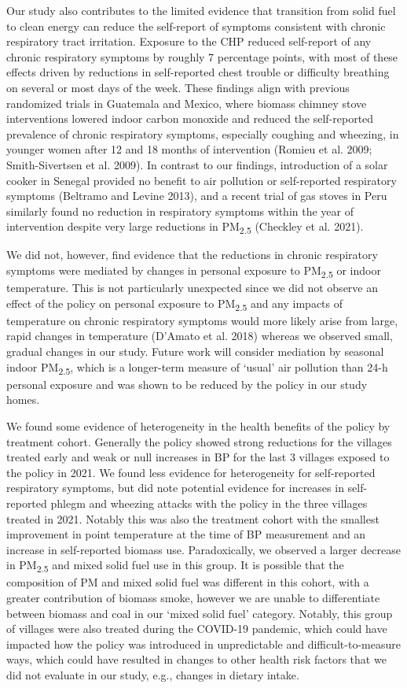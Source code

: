 \documentclass[
  letterpaper,
  DIV=11,
  numbers=noendperiod]{scrartcl}
\begin{document}
Our study also contributes to the limited evidence that transition from
solid fuel to clean energy can reduce the self-report of symptoms
consistent with chronic respiratory tract irritation. Exposure to the
CHP reduced self-report of any chronic respiratory symptoms by roughly 7
percentage points, with most of these effects driven by reductions in
self-reported chest trouble or difficulty breathing on several or most
days of the week. These findings align with previous randomized trials
in Guatemala and Mexico, where biomass chimney stove interventions
lowered indoor carbon monoxide and reduced the self-reported prevalence
of chronic respiratory symptoms, especially coughing and wheezing, in
younger women after 12 and 18 months of intervention (Romieu et al.
2009; Smith-Sivertsen et al. 2009). In contrast to our findings,
introduction of a solar cooker in Senegal provided no benefit to air
pollution or self-reported respiratory symptoms (Beltramo and Levine
2013), and a recent trial of gas stoves in Peru similarly found no
reduction in respiratory symptoms within the year of intervention
despite very large reductions in PM\textsubscript{2.5} (Checkley et al.
2021).

We did not, however, find evidence that the reductions in chronic
respiratory symptoms were mediated by changes in personal exposure to
PM\textsubscript{2.5} or indoor temperature. This is not particularly
unexpected since we did not observe an effect of the policy on personal
exposure to PM\textsubscript{2.5} and any impacts of temperature on
chronic respiratory symptoms would more likely arise from large, rapid
changes in temperature (D'Amato et al. 2018) whereas we observed small,
gradual changes in our study. Future work will consider mediation by
seasonal indoor PM\textsubscript{2.5}, which is a longer-term measure of
`usual' air pollution than 24-h personal exposure and was shown to be
reduced by the policy in our study homes.

We found some evidence of heterogeneity in the health
benefits of the policy by treatment cohort. Generally the policy showed
strong reductions for the villages treated early and weak or null
increases in BP for the last 3 villages exposed to the policy in 2021.
We found less evidence for heterogeneity for self-reported respiratory
symptoms, but did note potential evidence for increases in self-reported
phlegm and wheezing attacks with the policy in the three villages
treated in 2021. Notably this was also the treatment cohort with the
smallest improvement in point temperature at the time of BP measurement
and an increase in self-reported biomass use. Paradoxically, we observed
a larger decrease in PM\textsubscript{2.5} and mixed solid fuel use in
this group. It is possible that the composition of PM and mixed solid
fuel was different in this cohort, with a greater contribution of
biomass smoke, however we are unable to differentiate between biomass
and coal in our `mixed solid fuel' category. Notably, this group of
villages were also treated during the COVID-19 pandemic, which could
have impacted how the policy was introduced in unpredictable and
difficult-to-measure ways, which could have resulted in changes to other
health risk factors that we did not evaluate in our study, e.g., changes
in dietary intake.
\end{document}

